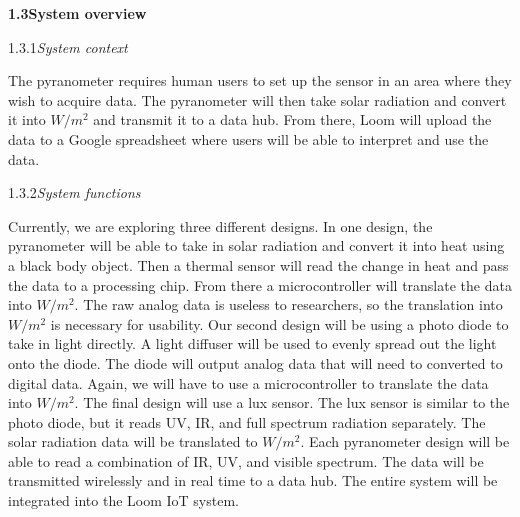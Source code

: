 \documentclass[10pt,draftclsnofoot,onecolumn,letterpaper]{article}
\begin{document}
{\fontsize{10pt}{12.0pt} \textbf{1.3\quad System overview}\\\selectfont 
\par}\par
{\fontsize{10pt}{12.0pt} 1.3.1\quad \textit{System context}\\\selectfont 
\par}\par
{\fontsize{10pt}{12.0pt} 
The pyranometer requires human users to set up the sensor in an area where they wish to acquire data. The pyranometer will then take solar radiation and convert it into $W/m^2$ and transmit it to a data hub. From there, Loom will upload the data to a Google spreadsheet where users will be able to interpret and use the data.\\\selectfont 
\par}\par

{\fontsize{10pt}{12.0pt} 1.3.2\quad \textit{System functions}\\\selectfont 
\par}\par
{\fontsize{10pt}{12.0pt} Currently, we are exploring three different designs. In one design, the pyranometer will be able to take in solar radiation and convert it into heat using a black body object. Then a thermal sensor will read the change in heat and pass the data to a processing chip. From there a microcontroller will translate the data into $W/m^2$. The raw analog data is useless to researchers, so the translation into $W/m^2$ is necessary for usability. Our second design will be using a photo diode to take in light directly. A light diffuser will be used to evenly spread out the light onto the diode. The diode will output analog data that will need to converted to digital data. Again, we will have to use a microcontroller to translate the data into $W/m^2$. The final design will use a lux sensor. The lux sensor is similar to the photo diode, but it reads UV, IR, and full spectrum radiation separately. The solar radiation data will be translated to $W/m^2$. Each pyranometer design will be able to read a combination of IR, UV, and visible spectrum. The data will be transmitted wirelessly and in real time to a data hub. The entire system will be integrated into the Loom IoT system.\\\selectfont 
\par}\par
\end{document}

